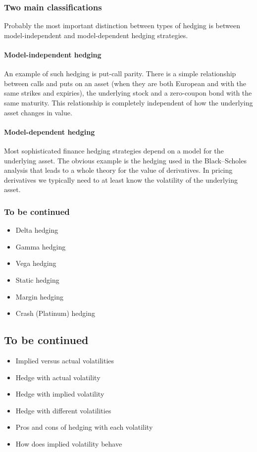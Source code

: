 \subsubsection{Two main classifications}
Probably the most important distinction between types of hedging is between model-independent and model-dependent hedging strategies.

\paragraph{Model-independent hedging}
An example of such hedging is put-call parity. There is a simple relationship between calls and puts on an asset (when they are both European and with the same strikes and expiries), the underlying stock and a zero-coupon bond with the same maturity. This relationship is completely independent of how the underlying asset changes in value.

\paragraph{Model-dependent hedging}
Most sophisticated finance hedging strategies depend on a model for the underlying asset. The obvious example is the hedging used in the Black–Scholes analysis that leads to a whole theory for the value of derivatives. In pricing derivatives we typically need to at least know the volatility of the underlying asset.


\subsubsection{To be continued}
\begin{itemize}
	\setlength\itemsep{0em}
	\item Delta hedging
	\item Gamma hedging
	\item Vega hedging
	\item Static hedging
	\item Margin hedging
	\item Crash (Platinum) hedging
\end{itemize}



\subsection{To be continued}
\begin{itemize}
	\setlength\itemsep{0em}
	\item Implied versus actual volatilities
	\item Hedge with actual volatility
	\item Hedge with implied volatility
	\item Hedge with different volatilities
	\item Pros and cons of hedging with each volatility
	\item How does implied volatility behave
\end{itemize}



